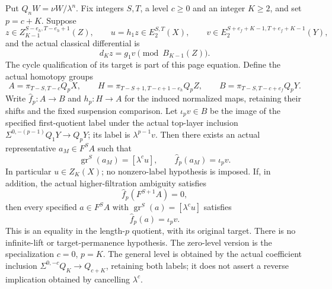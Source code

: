 \begin{theorem}
Put $Q_nW=\nu W/\lambda^n$. Fix integers $S,T$, a level $c\geq0$ and
an integer $K\geq2$, and set $p=c+K$. Suppose
\[
 z\in Z_{K-1}^{S-e_h,T-e_h+1}(Z),\qquad
 u=h_1z\in E_2^{S,T}(X),\qquad
 v\in E_2^{S+e_f+K-1,T+e_f+K-1}(Y),
\]
and the actual classical differential is
\[
 d_Kz=g_1v\pmod{B_{K-1}(Z)}.
\]
The cycle qualification of its target is part of this page equation.
Define the actual homotopy groups
\[
 A=\pi_{T-S,T-c}Q_pX,\qquad
 H=\pi_{T-S+1,T-c+1-e_h}Q_pZ,\qquad
 B=\pi_{T-S,T-c+e_f}Q_pY.
\]
Write $\widehat f_p:A\to B$ and $h_p:H\to A$ for the induced normalized
maps, retaining their shifts and the fixed suspension comparison.
Let $\iota_pv\in B$ be the image of the specified first-quotient label
under the actual top-layer inclusion
$\Sigma^{0,-(p-1)}Q_1Y\to Q_pY$; its label is $\lambda^{p-1}v$.
Then there exists an actual representative $a_M\in F^SA$ such that
\[
 \operatorname{gr}^{S}(a_M)=[\lambda^cu],\qquad
 \widehat f_p(a_M)=\iota_pv.
\tag{M}
\]
In particular $u\in Z_K(X)$; no nonzero-label hypothesis is imposed.
If, in addition, the actual higher-filtration ambiguity satisfies
\[
 \widehat f_p(F^{S+1}A)=0,
\tag{A}
\]
then every specified $a\in F^SA$ with
$\operatorname{gr}^{S}(a)=[\lambda^cu]$ satisfies
\[
 \widehat f_p(a)=\iota_pv.
\tag{Cores}
\]
This is an equality in the length-$p$ quotient, with its original target.
There is no infinite-lift or target-permanence hypothesis.
The zero-level version is the specialization $c=0$, $p=K$.
The general level is obtained by the actual coefficient inclusion
$\Sigma^{0,-c}Q_K\to Q_{c+K}$, retaining both labels; it does not
assert a reverse implication obtained by cancelling $\lambda^c$.
\end{theorem}
